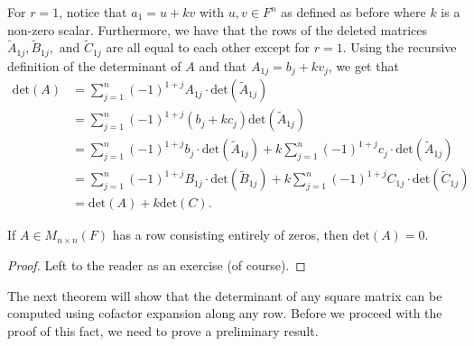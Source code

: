 \begin{remark}
   For \( r = 1  \), notice that \( {a}_{1} = u + kv  \) with \( u,v \in F^{n} \) as defined as before where \( k  \) is a non-zero scalar. Furthermore, we have that the rows of the deleted matrices \( {\tilde{A}}_{1j}, {\tilde{B}}_{1j},  \) and \( {\tilde{C}}_{1j} \) are all equal to each other except for \( r = 1  \). Using the recursive definition of the determinant of \( A  \) and that \( {A}_{1j} = {b}_{j} + k {v}_{j} \), we get that
   \begin{align*}
       \text{det}(A) &= \sum_{ j=1 }^{ n } (-1)^{1+j} {A}_{1j} \cdot \text{det}({\tilde{A}}_{1j}) \\
                     &= \sum_{ j=1 }^{ n } (-1)^{1+j} ({b}_{j} + {kc}_{j}) \text{det}({\tilde{A}}_{1j}) \\
                     &= \sum_{ j=1 }^{ n } (-1)^{1+j} {b}_{j} \cdot \text{det}({\tilde{A}}_{1j}) + k \sum_{ j=1 }^{ n } (-1)^{1+j}{c}_{j} \cdot \text{det} ({\tilde{A}}_{1j}) \\
                     &= \sum_{ j=1 }^{ n } (-1)^{1+j} {B}_{1j} \cdot \text{det}({\tilde{B}}_{1j}) + k \sum_{ j=1 }^{ n } (-1)^{1+j}{C}_{1j} \cdot \text{det} ({\tilde{C}}_{1j}) \\
                     &= \text{det}(A) + k \text{det}(C).
   \end{align*}
\end{remark}

\begin{corollary}
    If \( A \in {M}_{n \times n }(F) \) has a row consisting entirely of zeros, then \( \text{det}(A) =  0  \).
\end{corollary}
\begin{proof}
Left to the reader as an exercise (of course).
\end{proof}

The next theorem will show that the determinant of any square matrix can be computed using cofactor expansion along any row. Before we proceed with the proof of this fact, we need to prove a preliminary result.

